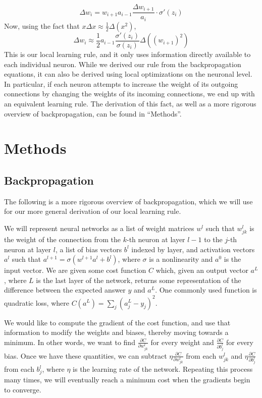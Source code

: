 \documentclass[12pt]{article}
\newcommand{\partialderiv}[2]{\frac{\partial #1}{\partial #2}}
\begin{document}
\begin{equation}
	\Delta w_i = w_{i+1}a_{i-1}\frac{\Delta w_{i+1}}{a_i}\cdot\sigma'(z_i)
\end{equation}
Now, using the fact that $x\Delta x\approx\frac{1}{2}\Delta (x^2)$,
\begin{equation}
	\Delta w_i\approx \frac{1}{2}a_{i-1}\frac{\sigma'\left(z_i\right)}{\sigma\left(z_i\right)}\Delta \left(\left(w_{i+1}\right)^2\right)
\end{equation}
This is our local learning rule, and it only uses information directly available to each individual neuron. While we derived our rule from the backpropagation equations, it can also be derived using local optimizations on the neuronal level. In particular, if each neuron attempts to increase the weight of its outgoing connections by changing the weights of its incoming connections, we end up with an equivalent learning rule. The derivation of this fact, as well as a more rigorous overview of backpropagation, can be found in ``Methods''.

\section{Methods}
\subsection{Backpropagation}
The following is a more rigorous overview of backpropagation, which we will use for our more general derivation of our local learning rule.

We will represent neural networks as a list of weight matrices $w^l$ such that $w^{l}_{jk}$ is the weight of the connection from the $k$-th neuron at layer $l-1$ to the $j$-th neuron at layer $l$, a list of bias vectors $b^l$ indexed by layer, and activation vectors $a^l$ such that $a^{l+1}=\sigma\left(w^{l+1}a^l + b^l\right)$, where $\sigma$ is a nonlinearity and $a^0$ is the input vector. We are given some cost function $C$ which, given an output vector $a^L$, where $L$ is the last layer of the network, returns some representation of the difference between the expected answer $y$ and $a^L$. One commonly used function is quadratic loss, where $C\left(a^L\right) = \sum_j \left(a^L_j - y_j\right)^2$.

We would like to compute the gradient of the cost function, and use that information to modify the weights and biases, thereby moving towards a minimum. In other words, we want to find $\partialderiv{C}{w^l_{jk}}$ for every weight and $\partialderiv{C}{b^l_j}$ for every bias. Once we have these quantities, we can subtract $\eta\partialderiv{C}{w^l_{jk}}$ from each $w^l_{jk}$ and $\eta\partialderiv{C}{b^l_{j}}$ from each $b^l_j$, where $\eta$ is the learning rate of the network. Repeating this process many times, we will eventually reach a minimum cost when the gradients begin to converge.
\end{document}
